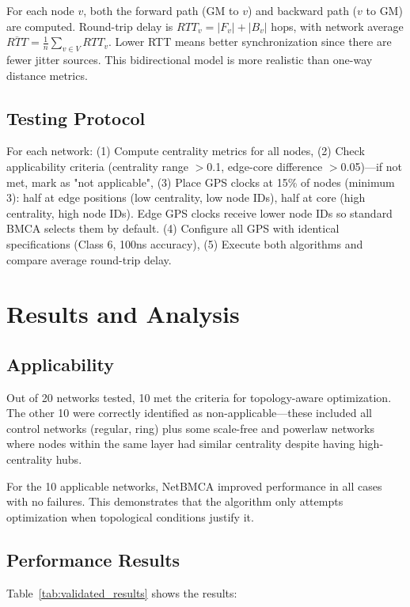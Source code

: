 \documentclass[conference]{IEEEtran}
\begin{document}
For each node $v$, both the forward path (GM to $v$) and backward path ($v$ to GM) are computed. Round-trip delay is $RTT_v = |F_v| + |B_v|$ hops, with network average $\overline{RTT} = \frac{1}{n}\sum_{v \in V} RTT_v$. Lower RTT means better synchronization since there are fewer jitter sources. This bidirectional model is more realistic than one-way distance metrics.

\subsection{Testing Protocol}

For each network: (1) Compute centrality metrics for all nodes, (2) Check applicability criteria (centrality range $>$0.1, edge-core difference $>$0.05)---if not met, mark as "not applicable", (3) Place GPS clocks at 15\% of nodes (minimum 3): half at edge positions (low centrality, low node IDs), half at core (high centrality, high node IDs). Edge GPS clocks receive lower node IDs so standard BMCA selects them by default. (4) Configure all GPS with identical specifications (Class 6, 100ns accuracy), (5) Execute both algorithms and compare average round-trip delay.

\section{Results and Analysis}

\subsection{Applicability}

Out of 20 networks tested, 10 met the criteria for topology-aware optimization. The other 10 were correctly identified as non-applicable---these included all control networks (regular, ring) plus some scale-free and powerlaw networks where nodes within the same layer had similar centrality despite having high-centrality hubs.

For the 10 applicable networks, NetBMCA improved performance in all cases with no failures. This demonstrates that the algorithm only attempts optimization when topological conditions justify it.

\subsection{Performance Results}

Table~\ref{tab:validated_results} shows the results:
\end{document}
